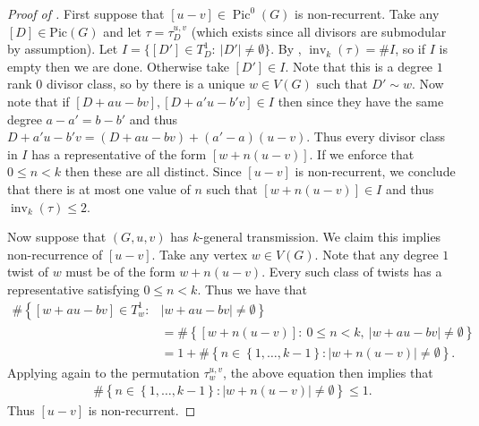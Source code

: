 \documentclass[11pt]{article}
\theoremstyle{definition}
\numberwithin{equation}{section}
\newcommand{\pic}[1]{\mathrm{Pic}\left({#1}\right)}
\newcommand{\inv}{\operatorname{inv}}
\newcommand{\set}[1]{\left\{{#1}\right\}}
\newcommand{\tauD}{\tau^{u,v}_D}
\newcommand{\Pic}{\operatorname{Pic}}
\begin{document}
\begin{proof}[Proof of ] \label{proof:kgtThetas}
First suppose that $[u-v] \in \Pic^0(G)$ is non-recurrent. Take any $[D] \in \pic{G}$ and let $\tau = \tauD$ (which exists since all divisors are submodular by assumption). Let $I  =\{ [D'] \in T^1_D:\ |D'| \neq \emptyset \}$. By , $\inv_k(\tau) = \# I$, so if $I$ is empty then we are done. Otherwise take $[D'] \in I$. Note that this is a degree $1$ rank $0$ divisor class, so by  there is a unique $w \in V(G)$ such that $D' \sim w$. Now note that if $[D+au-bv], [D+a'u-b'v] \in I$ then since they have the same degree $a-a' = b-b'$ and thus $D+a'u-b'v = (D+au-bv)+(a'-a)(u-v)$. Thus every divisor class in $I$ has a representative of the form $[w+n(u-v)]$. If we enforce that $0\leq n < k$ then these are all distinct. Since $[u-v]$ is non-recurrent, we conclude that there is at most one value of $n$ such that $[w+n(u-v)] \in I$ and thus $\inv_k(\tau) \leq 2$.

Now suppose that $(G,u,v)$ has $k$-general transmission. We claim this implies non-recurrence of $[u-v]$. Take any vertex $w \in V(G)$. Note that any degree $1$ twist of $w$ must be of the form $w + n(u-v)$. Every such class of twists has a representative satisfying $0\leq n <k$. Thus we have that
\begin{align*}
    \#\left\{[w+au-bv] \in T^1_w:\right.&\left.|w+au-bv|\neq \emptyset\right\} \\&= \#\set{[w+n(u-v)]:\ 0\leq n<k,\ |w+au-bv|\neq \emptyset }\\
    &= 1 + \#\set{n \in \set{1,\dots, k-1}:|w+n(u-v)| \neq \emptyset}.
\end{align*}
Applying  again to the permutation $\tau_{w}^{u,v}$, the above equation then implies that
\begin{align*}
    \#\set{n \in \set{1,\dots, k-1}:|w+n(u-v)| \neq \emptyset} \leq 1.
\end{align*}
Thus $[u-v]$ is non-recurrent.
\end{proof}
\end{document}
